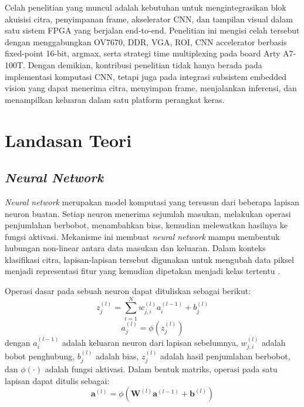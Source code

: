     Celah penelitian yang muncul adalah kebutuhan untuk mengintegrasikan blok
    akuisisi citra, penyimpanan frame, akselerator CNN, dan tampilan visual dalam
    satu sistem FPGA yang berjalan end-to-end. Penelitian ini mengisi celah
    tersebut dengan menggabungkan OV7670, DDR, VGA, ROI, CNN accelerator berbasis
    fixed-point 16-bit, argmax, serta strategi time multiplexing pada board Arty
    A7-100T. Dengan demikian, kontribusi penelitian tidak hanya berada pada
    implementasi komputasi CNN, tetapi juga pada integrasi subsistem embedded
    vision yang dapat menerima citra, menyimpan frame, menjalankan inferensi, dan
    menampilkan keluaran dalam satu platform perangkat keras.

\section{Landasan Teori}

    \subsection{\emph{Neural Network}}
    \emph{Neural network} merupakan model komputasi yang tersusun dari beberapa lapisan neuron buatan. Setiap neuron menerima sejumlah masukan, melakukan operasi penjumlahan berbobot, menambahkan bias, kemudian melewatkan hasilnya ke fungsi aktivasi. Mekanisme ini membuat \emph{neural network} mampu membentuk hubungan non-linear antara data masukan dan keluaran. Dalam konteks klasifikasi citra, lapisan-lapisan tersebut digunakan untuk mengubah data piksel menjadi representasi fitur yang kemudian dipetakan menjadi kelas tertentu \cite{Goodfellow2016DeepLearning}.

    Operasi dasar pada sebuah neuron dapat dituliskan sebagai berikut:
    \begin{equation}
        z_j^{(l)} =
        \sum_{i=1}^{N}
        w_{j,i}^{(l)} a_i^{(l-1)}
        + b_j^{(l)}
        \label{eq:neuron_linear}
    \end{equation}
    \begin{equation}
        a_j^{(l)} =
        \phi \left( z_j^{(l)} \right)
        \label{eq:neuron_activation}
    \end{equation}
    dengan $a_i^{(l-1)}$ adalah keluaran neuron dari lapisan sebelumnya, $w_{j,i}^{(l)}$ adalah bobot penghubung, $b_j^{(l)}$ adalah bias, $z_j^{(l)}$ adalah hasil penjumlahan berbobot, dan $\phi(\cdot)$ adalah fungsi aktivasi. Dalam bentuk matriks, operasi pada satu lapisan dapat ditulis sebagai:
    \begin{equation}
        \mathbf{a}^{(l)} =
        \phi \left(
        \mathbf{W}^{(l)} \mathbf{a}^{(l-1)}
        + \mathbf{b}^{(l)}
        \right)
        \label{eq:nn_layer}
    \end{equation}

